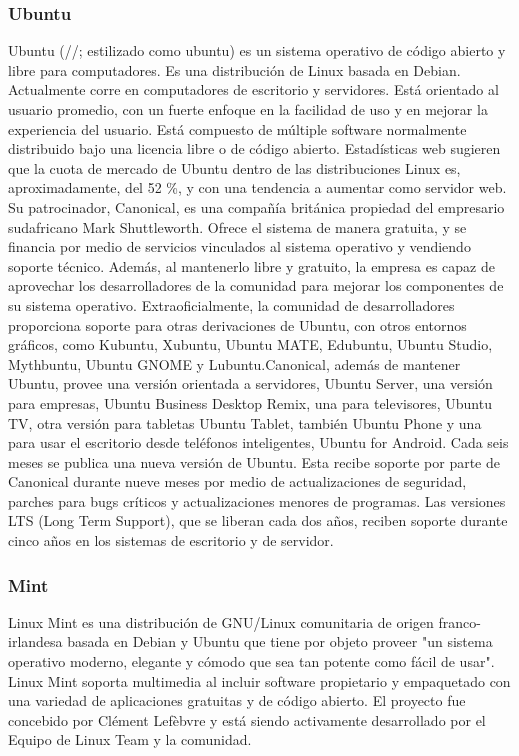 \subsubsection{Ubuntu}
Ubuntu (//; estilizado como ubuntu) es un sistema operativo de código abierto y libre para computadores. Es una distribución de Linux basada en Debian. Actualmente corre en computadores de escritorio y servidores. Está orientado al usuario promedio, con un fuerte enfoque en la facilidad de uso y en mejorar la experiencia del usuario. Está compuesto de múltiple software normalmente distribuido bajo una licencia libre o de código abierto. Estadísticas web sugieren que la cuota de mercado de Ubuntu dentro de las distribuciones Linux es, aproximadamente, del 52 \%, y con una tendencia a aumentar como servidor web.
Su patrocinador, Canonical, es una compañía británica propiedad del empresario sudafricano Mark Shuttleworth. Ofrece el sistema de manera gratuita, y se financia por medio de servicios vinculados al sistema operativo y vendiendo soporte técnico. Además, al mantenerlo libre y gratuito, la empresa es capaz de aprovechar los desarrolladores de la comunidad para mejorar los componentes de su sistema operativo. Extraoficialmente, la comunidad de desarrolladores proporciona soporte para otras derivaciones de Ubuntu, con otros entornos gráficos, como Kubuntu, Xubuntu, Ubuntu MATE, Edubuntu, Ubuntu Studio, Mythbuntu, Ubuntu GNOME y Lubuntu.Canonical, además de mantener Ubuntu, provee una versión orientada a servidores, Ubuntu Server, una versión para empresas, Ubuntu Business Desktop Remix, una para televisores, Ubuntu TV, otra versión para tabletas Ubuntu Tablet, también Ubuntu Phone y una para usar el escritorio desde teléfonos inteligentes, Ubuntu for Android.
Cada seis meses se publica una nueva versión de Ubuntu. Esta recibe soporte por parte de Canonical durante nueve meses por medio de actualizaciones de seguridad, parches para bugs críticos y actualizaciones menores de programas. Las versiones LTS (Long Term Support), que se liberan cada dos años, reciben soporte durante cinco años en los sistemas de escritorio y de servidor.

\subsubsection{Mint}
Linux Mint es una distribución de GNU/Linux comunitaria de origen franco-irlandesa basada en Debian y Ubuntu que tiene por objeto proveer "un sistema operativo moderno, elegante y cómodo que sea tan potente como fácil de usar". Linux Mint soporta multimedia al incluir software propietario y empaquetado con una variedad de aplicaciones gratuitas y de código abierto.
El proyecto fue concebido por Clément Lefèbvre y está siendo activamente desarrollado por el Equipo de Linux Team y la comunidad.

